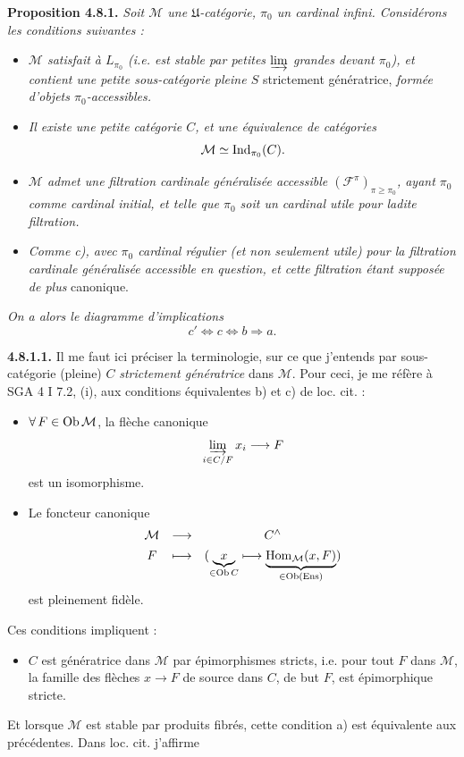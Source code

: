 \textbf{Proposition 4.8.1.} \textit{Soit $\mathcal{M}$ une $\mathfrak{U}$-catégorie, $\pi_0$ un cardinal infini. Considérons les conditions suivantes :}
\begin{itemize}[label={}]
\item[\textit{a)}] \textit{$\mathcal{M}$ satisfait à $L_{\pi_0}$ (i.e. est stable par petites $\varinjlim$ grandes devant $\pi_0$), et contient une petite sous-catégorie pleine $S$} strictement génératrice, \textit{formée d'objets $\pi_0$-accessibles.}
\item[\textit{b)}] \textit{Il existe une petite catégorie $C$, et une équivalence de catégories}
\[ \mathcal{M} \simeq \operatorname{Ind}_{\pi_0}(C) . \]
\item[\textit{c)}] \textit{$\mathcal{M}$ admet une filtration cardinale généralisée accessible $(\mathcal{F}^\pi)_{\pi\geqslant\pi_0}$, ayant $\pi_0$ comme cardinal initial, et telle que $\pi_0$ soit un cardinal utile pour ladite filtration.}
\end{itemize}


\begin{itemize}[label={}]
\item[\textit{c$'$)}] \textit{Comme c), avec $\pi_0$ cardinal régulier (et non seulement utile) pour la filtration cardinale généralisée accessible en question, et cette filtration étant supposée de plus} canonique.
\end{itemize}
\textit{On a alors le diagramme d'implications}
\[ c' \Longleftrightarrow c \Longleftrightarrow b \Longrightarrow a . \]

\textbf{4.8.1.1.} Il me faut ici préciser la terminologie, sur ce que j'entends par sous-catégorie (pleine) $C$ \textit{strictement génératrice} dans $\mathcal{M}$. Pour ceci, je me réfère à SGA 4 I 7.2, (i), aux conditions équivalentes b) et c) de loc. cit. :
\begin{itemize}[label={}]
\item[\circled{b}] $\forall\, F \in \operatorname{Ob} \mathcal{M}$, la flèche canonique
\[ \varinjlim_{i\in C/F} x_i \longrightarrow F \]
est un isomorphisme.
\item[\circled{c}] Le foncteur canonique
\[ \begin{array}{ccc}
\mathcal{M} & \longrightarrow & C^{\wedge} \\[1ex]
F & \longmapsto & (\underbrace{x}_{\in \operatorname{Ob} C} \longmapsto \underbrace{\operatorname{Hom}_{\mathcal{M}}(x,F)}_{\in \operatorname{Ob} (\mathrm{Ens})})
\end{array} \]
est pleinement fidèle.
\end{itemize}
Ces conditions impliquent :
\begin{itemize}[label={}]
\item[a)] $C$ est génératrice dans $\mathcal{M}$ par épimorphismes stricts, i.e. pour tout $F$ dans $\mathcal{M}$, la famille des flèches $x \longrightarrow F$ de source dans $C$, de but $F$, est épimorphique stricte.
\end{itemize}
Et lorsque $\mathcal{M}$ est stable par produits fibrés, cette condition a) est équivalente aux précédentes. Dans loc. cit. j'affirme

